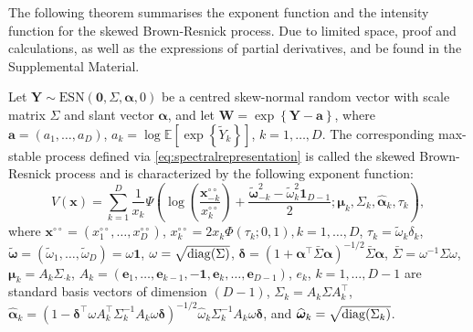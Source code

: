 \documentclass[lineno]{biometrika}
\begin{document}
The following theorem summarises the exponent function and the intensity function for the skewed Brown-Resnick process. Due to limited space, 
proof and calculations, as well as the expressions of partial derivatives, and be found in the Supplemental Material. 

\begin{theorem}
\label{thm:skewBR}
Let $\bm Y \sim \text{ESN}(\bm 0,\Sigma,\bm\alpha,0)$ be a centred skew-normal random vector with scale matrix $\Sigma$ and slant vector $\bm \alpha$, and let $\bm W = \exp\left\{ \bm Y - \bm a \right\}$, where $\bm a = (a_1, \ldots, a_D)$, $a_k=\log \mathbb E\left[\exp\left\{\tilde Y_k \right\}\right]$, $k=1, \ldots, D$. The corresponding max-stable process defined via \eqref{eq:spectralrepresentation} is called the skewed Brown-Resnick process and is characterized by the following exponent function:
%
\begin{equation}
\label{eq:V_skBR}
V(\bm x) =\sum_{k=1}^D \frac{1}{x_k} 
\Psi \left(\log \left( \frac{\bm x^{\circ\circ}_{-k}}{x^{\circ\circ}_k} \right) + \frac{\tilde{\bm \omega}_{-k}^2 - \tilde{\omega}_k^2 \bm 1_{D-1}}{2} ; \bm \mu_k, \Sigma_k, \hat{\bm \alpha}_k, \tau_k \right),
\end{equation}
%
where 
$\bm x^{\circ\circ} = \left( x^{\circ\circ}_1, \ldots, x^{\circ\circ}_D\right)$, 
$x^{\circ\circ}_k = 2x_k \Phi\left( \tau_k; 0, 1 \right), k=1, \ldots, D$, 
$\tau_k = \tilde{\omega}_k \delta_k$, $\tilde{\bm \omega} = \left( \tilde{\omega}_1, \ldots, \tilde{ \omega}_D\right) = \omega \bm 1$, $\omega = \sqrt{{\rm diag}(\Sigma)}$, 
$\bm \delta = \left( 1 + \bm \alpha^\top \bar{\Sigma} \bm \alpha\right)^{-1/2}\bar{\Sigma} \bm \alpha$, 
$\bar{\Sigma} = \omega^{-1} \Sigma \omega$,
$\bm\mu_k = A_k \Sigma_{\cdot k}$, 
$A_k = (\bm e_1, \ldots,\bm e_{k-1}, -\bm 1,\bm e_{k},\ldots,\bm e_{D-1})$, 
$e_k$, $k=1, \ldots, D-1$ are standard basis vectors of dimension $(D-1)$, 
$\Sigma_k = A_k \Sigma A_k^\top$, 
$\hat{\bm\alpha}_k = \left(1-\bm\delta^\top \omega A_k^\top\Sigma_k^{-1} A_k \omega\bm\delta \right)^{-1/2} \hat{ \omega}_k\Sigma_k^{-1}A_k \omega\bm\delta$, 
and ${\widehat{\bm \omega}}_k = \sqrt{{\rm diag}(\Sigma_k)}$.
\end{theorem}
\end{document}
